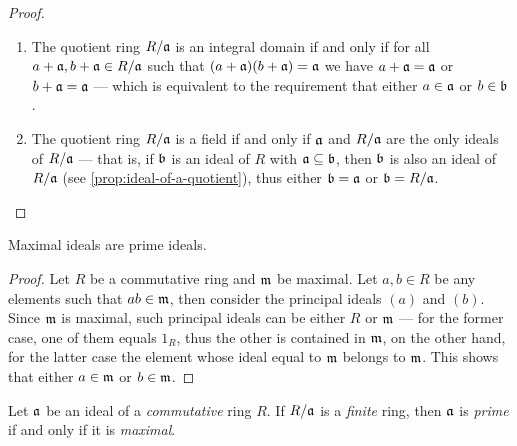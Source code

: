 \begin{proof}
    \begin{enumerate}\setlength\itemsep{0em}
        \item The quotient ring \(R/\mathfrak{a}\) is an integral domain if and only if for
              all \(a + \mathfrak{a}, b + \mathfrak{a} \in R/\mathfrak{a}\) such that
              \((a + \mathfrak{a})(b + \mathfrak{a}) = \mathfrak{a}\) we have
              \(a + \mathfrak{a} = \mathfrak{a}\) or \(b + \mathfrak{a} = \mathfrak{a}\) --- which is
              equivalent to the requirement that either \(a \in \mathfrak{a}\) or
              \(b \in \mathfrak{b}\).

        \item The quotient ring \(R/\mathfrak{a}\) is a field if and only if \(\mathfrak{a}\)
              and \(R/\mathfrak{a}\) are the only ideals of \(R/\mathfrak{a}\) --- that is, if
              \(\mathfrak{b}\) is an ideal of \(R\) with \(\mathfrak{a} \subseteq \mathfrak{b}\),
              then \(\mathfrak{b}\) is also an ideal of \(R/\mathfrak{a}\) (see
              \cref{prop:ideal-of-a-quotient}), thus either \(\mathfrak{b} = \mathfrak{a}\) or
              \(\mathfrak{b} = R/\mathfrak{a}\).
    \end{enumerate}
\end{proof}

\begin{corollary}
    \label{cor:maximal-implies-prime}
    Maximal ideals are prime ideals.
\end{corollary}

\begin{proof}
    Let \(R\) be a commutative ring and \(\mathfrak{m}\) be maximal. Let \(a, b \in R\)
    be any elements such that \(a b \in \mathfrak{m}\), then consider the principal
    ideals \((a)\) and \((b)\). Since \(\mathfrak{m}\) is maximal, such principal
    ideals can be either \(R\) or \(\mathfrak{m}\) --- for the former case, one of them
    equals \(1_R\), thus the other is contained in \(\mathfrak{m}\), on the other hand,
    for the latter case the element whose ideal equal to \(\mathfrak{m}\) belongs to
    \(\mathfrak{m}\). This shows that either \(a \in \mathfrak{m}\) or
    \(b \in \mathfrak{m}\).
\end{proof}

\begin{proposition}
    \label{prop:finite-quotient-prime-iff-maximal}
    Let \(\mathfrak{a}\) be an ideal of a \emph{commutative} ring \(R\). If
    \(R/\mathfrak{a}\) is a \emph{finite} ring, then \(\mathfrak{a}\) is \emph{prime} if
    and only if it is \emph{maximal}.
\end{proposition}

